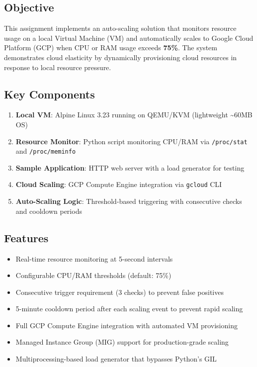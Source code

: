 \documentclass[12pt,a4paper]{article}
\begin{document}
\subsection{Objective}

This assignment implements an auto-scaling solution that monitors resource usage on a local
Virtual Machine (VM) and automatically scales to Google Cloud Platform (GCP) when CPU or RAM
usage exceeds \textbf{75\%}. The system demonstrates cloud elasticity by dynamically provisioning
cloud resources in response to local resource pressure.

\subsection{Key Components}

\begin{enumerate}
    \item \textbf{Local VM}: Alpine Linux 3.23 running on QEMU/KVM (lightweight \textasciitilde60MB OS)
    \item \textbf{Resource Monitor}: Python script monitoring CPU/RAM via \texttt{/proc/stat} and \texttt{/proc/meminfo}
    \item \textbf{Sample Application}: HTTP web server with a load generator for testing
    \item \textbf{Cloud Scaling}: GCP Compute Engine integration via \texttt{gcloud} CLI
    \item \textbf{Auto-Scaling Logic}: Threshold-based triggering with consecutive checks and cooldown periods
\end{enumerate}

\subsection{Features}

\begin{itemize}
    \item Real-time resource monitoring at 5-second intervals
    \item Configurable CPU/RAM thresholds (default: 75\%)
    \item Consecutive trigger requirement (3 checks) to prevent false positives
    \item 5-minute cooldown period after each scaling event to prevent rapid scaling
    \item Full GCP Compute Engine integration with automated VM provisioning
    \item Managed Instance Group (MIG) support for production-grade scaling
    \item Multiprocessing-based load generator that bypasses Python's GIL
\end{itemize}
\end{document}
